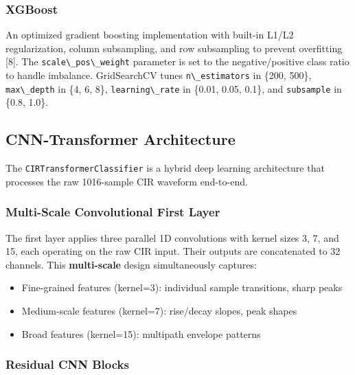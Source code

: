 \documentclass[12pt,a4paper]{article}
\newcommand{\passthrough}[1]{#1}
\providecommand{\passthrough}[1]{#1}
\providecommand{\tightlist}{%
  \setlength{\itemsep}{0pt}\setlength{\parskip}{0pt}}
\begin{document}
\subsubsection{XGBoost}\label{xgboost}

An optimized gradient boosting implementation with built-in L1/L2
regularization, column subsampling, and row subsampling to prevent
overfitting {[}8{]}. The \passthrough{\lstinline!scale\_pos\_weight!}
parameter is set to the negative/positive class ratio to handle
imbalance. GridSearchCV tunes \passthrough{\lstinline!n\_estimators!} in
\{200, 500\}, \passthrough{\lstinline!max\_depth!} in \{4, 6, 8\},
\passthrough{\lstinline!learning\_rate!} in \{0.01, 0.05, 0.1\}, and
\passthrough{\lstinline!subsample!} in \{0.8, 1.0\}.

\subsection{CNN-Transformer
Architecture}\label{cnn-transformer-architecture}

The \passthrough{\lstinline!CIRTransformerClassifier!} is a hybrid deep
learning architecture that processes the raw 1016-sample CIR waveform
end-to-end.

\subsubsection{Multi-Scale Convolutional First
Layer}\label{multi-scale-convolutional-first-layer}

The first layer applies three parallel 1D convolutions with kernel sizes
3, 7, and 15, each operating on the raw CIR input. Their outputs are
concatenated to 32 channels. This \textbf{multi-scale} design
simultaneously captures:

\begin{itemize}
\tightlist
\item
  Fine-grained features (kernel=3): individual sample transitions, sharp
  peaks
\item
  Medium-scale features (kernel=7): rise/decay slopes, peak shapes
\item
  Broad features (kernel=15): multipath envelope patterns
\end{itemize}

\subsubsection{Residual CNN Blocks}\label{residual-cnn-blocks}
\end{document}
